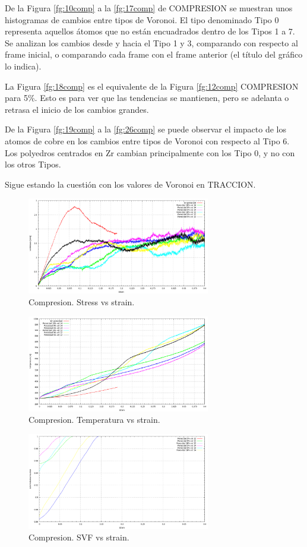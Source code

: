 \documentclass[10pt, oneside]{article} %
\begin{document}
De la Figura \ref{fg:10comp} a la \ref{fg:17comp} de COMPRESION se muestran unos histogramas de cambios entre tipos de Voronoi. El tipo denominado Tipo 0 representa aquellos átomos que no están encuadrados dentro de los Tipos 1 a 7. Se analizan los cambios desde y hacia el Tipo 1 y 3, comparando con respecto al frame inicial, o comparando cada frame con el frame anterior (el título del gráfico lo indica). 

La Figura \ref{fg:18comp} es el equivalente de la Figura \ref{fg:12comp} COMPRESION para 5\%. Esto es para ver que las tendencias se mantienen, pero se adelanta o retrasa el inicio de los cambios grandes.

De la Figura \ref{fg:19comp} a la \ref{fg:26comp} se puede observar el impacto de los atomos de cobre en los cambios entre tipos de Voronoi con respecto al Tipo 6. Los polyedros centrados en Zr cambian principalmente con los Tipo 0, y no con los otros Tipos.

Sigue estando la cuestión con los valores de Voronoi en TRACCION.

\begin{figure}[H]
\centering
\includegraphics[width=8cm]{Figures/Porosidad_VM_strain_2vel.png}
\caption{Compresion. Stress vs strain.}
\end{figure}

\begin{figure}[H]
\centering
\includegraphics[width=8cm]{Figures/Porosidad_temp_strain_2vel_comp.png}
\caption{Compresion. Temperatura vs strain.}
\end{figure}

\begin{figure}[H]
\centering
\includegraphics[width=8cm]{Figures/Porosidad_svf_strain_2vel_comp.png}
\caption{Compresion. SVF vs strain.}
\label{fg:3comp}
\end{figure}
\end{document}
